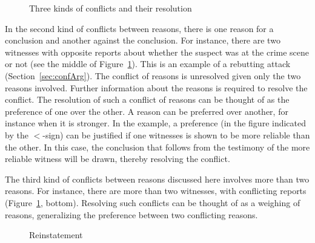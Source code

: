 \documentclass[10pt]{article}
\begin{document}

\begin{figure}[bt]
\centering

\caption{Three kinds of conflicts and their resolution\label{fig:conflicts}}
\end{figure}

In the second kind of conflicts between reasons, there is one reason for a conclusion and another against the conclusion. For instance, there are two witnesses with opposite reports about whether the suspect was at the crime scene or not (see the middle of Figure~\ref{fig:conflicts}). This is an example of a rebutting attack (Section~\ref{sec:confArg}). The conflict of reasons is unresolved given only the two reasons involved. Further information about the reasons is required to resolve the conflict. The resolution of such a conflict of reasons can be thought of as the preference of one over the other. A reason can be preferred over another, for instance when it is stronger. In the example, a preference (in the figure indicated by the $<$-sign) can be justified if one witnesses is shown to be more reliable than the other. In this case, the conclusion that follows from the testimony of the more reliable witness will be drawn, thereby resolving the conflict. 

The third kind of conflicts between reasons discussed here involves more than two reasons. For instance, there are more than two witnesses, with conflicting reports (Figure~\ref{fig:conflicts}, bottom). %
Resolving such conflicts can be thought of as a weighing of reasons, generalizing the preference between two conflicting reasons. 





\begin{figure}[bt]
\centering

\caption{Reinstatement\label{fig:reinstatement}}
\end{figure}
\end{document}
